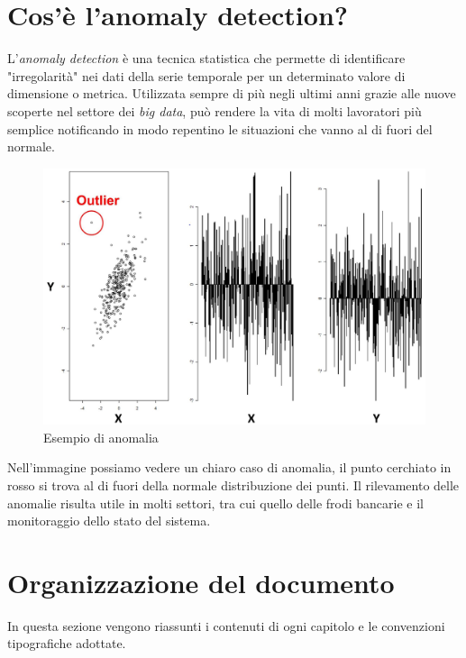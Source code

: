 \section{Cos'è l'anomaly detection?}
L'\emph{anomaly detection} è una tecnica statistica che permette di identificare "irregolarità" nei dati della serie temporale per un determinato valore di dimensione o metrica. 
Utilizzata sempre di più negli ultimi anni grazie alle nuove scoperte nel settore dei \emph{big data}, può rendere la vita di molti lavoratori più semplice notificando in modo repentino le situazioni che vanno al di fuori del normale.
\newpage
\begin{figure}[h!]
	\centering
	\includegraphics[scale=0.1]{figures/anomaly_detection_example}
	\caption[Esempio di anomalia.]{Esempio di anomalia \cite{anomalydetection}
		\label{fig:anomalia}}
\end{figure}	

Nell'immagine possiamo vedere un chiaro caso di anomalia, il punto cerchiato in rosso si trova al di fuori della normale distribuzione dei punti.
Il rilevamento delle anomalie risulta utile in molti settori, tra cui quello delle frodi bancarie e il monitoraggio dello stato del sistema. 
\section{Organizzazione del documento}
In questa sezione vengono riassunti i contenuti di ogni capitolo e le convenzioni tipografiche adottate.
